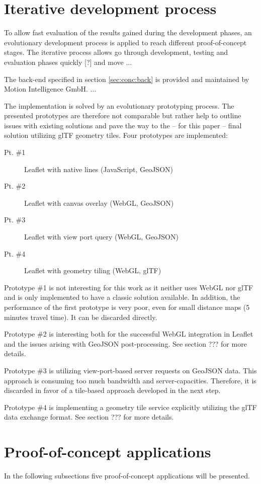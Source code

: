   \section{Iterative development process}
    To allow fast evaluation of the results gained during the development phases, an evolutionary development process is applied to reach different proof-of-concept stages. The iterative process allows go through development, testing and evaluation phases quickly [?] and move ...\par
    The back-end specified in section \ref{sec:conc:back} is provided and maintained by Motion Intelligence GmbH. ...\par
    The implementation is solved by an evolutionary prototyping process. The presented prototypes are therefore not comparable but rather help to outline issues with existing solutions and pave the way to the -- for this paper -- final solution utilizing glTF geometry tiles. Four prototypes are implemented:
    \begin{description}
      \item[Pt. \#1] Leaflet with native lines (JavaScript, GeoJSON)
      \item[Pt. \#2] Leaflet with canvas overlay (WebGL, GeoJSON)
      \item[Pt. \#3] Leaflet with view port query (WebGL, GeoJSON)
      \item[Pt. \#4] Leaflet with geometry tiling (WebGL, glTF)
    \end{description}
    Prototype \#1 is not interesting for this work as it neither uses WebGL nor glTF and is only implemented to have a classic solution available. In addition, the performance of the first prototype is very poor, even for small distance maps (5 minutes travel time). It can be discarded directly.\par
    Prototype \#2 is interesting both for the successful WebGL integration in Leaflet and the issues arising with GeoJSON post-processing. See section ??? for more details.\par
    Prototype \#3 is utilizing view-port-based server requests on GeoJSON data. This approach is consuming too much bandwidth and server-capacities. Therefore, it is discarded in favor of a tile-based approach developed in the next step.\par
    Prototype \#4 is implementing a geometry tile service explicitly utilizing the glTF data exchange format. See section ??? for more details.
  \section{Proof-of-concept applications}
    In the following subsections five proof-of-concept applications will be presented.\par
